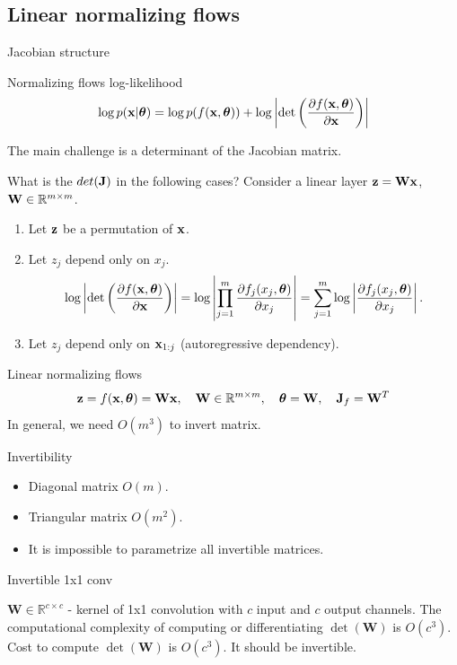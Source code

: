 \subsection{Linear normalizing flows}
\begin{frame}{Jacobian structure}
	\begin{block}{Normalizing flows log-likelihood}
		\[
			\log p(\mathbf{x}|\boldsymbol{\theta}) = \log p(f(\mathbf{x}, \boldsymbol{\theta})) + \log \left|\det \left( \frac{\partial f(\mathbf{x}, \boldsymbol{\theta})}{\partial \mathbf{x}} \right) \right|
		\]
	\end{block}
	The main challenge is a determinant of the Jacobian matrix.
	\begin{block}{What is the $det(\mathbf{J})$ in the following cases?}
		Consider a linear layer $\mathbf{z} = \mathbf{W} \mathbf{x}$, $\mathbf{W} \in \mathbb{R}^{m \times m}$.
		\begin{enumerate}
			\item Let $\mathbf{z}$ be a permutation of $\mathbf{x}$. 
			\item Let $z_j$ depend only on $x_j$. 
			\[
				\log \left|\det \left( \frac{\partial f(\mathbf{x}, \boldsymbol{\theta})}{\partial \mathbf{x}} \right) \right| = \log \left| \prod_{j=1}^m \frac{\partial f_j(x_j, \boldsymbol{\theta})}{\partial x_j} \right| = \sum_{j=1}^m \log \left|  \frac{\partial f_j(x_j, \boldsymbol{\theta})}{\partial x_j} \right|.
			\]
			\item Let $z_j$ depend only on $\mathbf{x}_{1:j}$ (autoregressive dependency). 
		\end{enumerate}
	\end{block}
\end{frame}
\begin{frame}{Linear normalizing flows}
	\[
		\mathbf{z} = f(\mathbf{x}, \boldsymbol{\theta}) = \mathbf{W} \mathbf{x}, \quad \mathbf{W} \in \mathbb{R}^{m \times m}, \quad \boldsymbol{\theta} = \mathbf{W}, \quad \mathbf{J}_f = \mathbf{W}^T
	\]
	In general, we need $O(m^3)$ to invert matrix.
	\begin{block}{Invertibility}
		\begin{itemize}
			\item Diagonal matrix $O(m)$.
			\item Triangular matrix $O(m^2)$.
			\item It is impossible to parametrize all invertible matrices.
		\end{itemize}
	\end{block}
	\begin{block}{Invertible 1x1 conv}
			
		$\mathbf{W} \in \mathbb{R}^{c \times c}$ - kernel of 1x1 convolution with $c$ input and $c$ output channels.
		The computational complexity of computing or differentiating $\det (\mathbf{W})$ is $O(c^3)$.
		Cost to compute $\det (\mathbf{W})$ is $O(c^3)$. It should be invertible.
	\end{block}
	
\end{frame}
